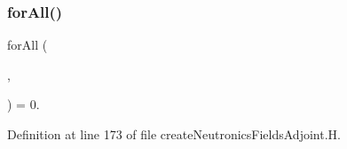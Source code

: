 \subsubsection{\texorpdfstring{for\+All()}{forAll()}\hspace{0.1cm}{\footnotesize\ttfamily [5/5]}}
{\footnotesize\ttfamily for\+All (\begin{DoxyParamCaption}\item[{prec\+\_\+}]{,  }\item[{precI}]{ }\end{DoxyParamCaption}) = 0.}



Definition at line 173 of file create\+Neutronics\+Fields\+Adjoint.\+H.

